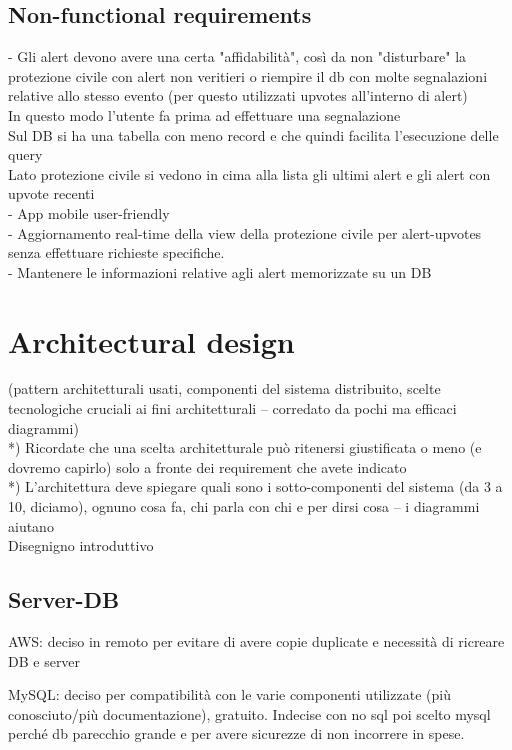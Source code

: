 \documentclass[a4paper,12pt]{report}
\begin{document}
\section{Non-functional requirements}
- Gli alert devono avere una certa "affidabilità", così da non "disturbare" la protezione civile con alert non veritieri o riempire il db con molte segnalazioni relative allo stesso evento (per questo utilizzati upvotes all'interno di alert)\\
In questo modo l'utente fa prima ad effettuare una segnalazione\\
Sul DB si ha una tabella con meno record e che quindi facilita l'esecuzione delle query\\
Lato protezione civile si vedono in cima alla lista gli ultimi alert e gli alert con upvote recenti\\
- App mobile user-friendly\\
- Aggiornamento real-time della view della protezione civile per alert-upvotes senza effettuare richieste specifiche.\\
- Mantenere le informazioni relative agli alert memorizzate su un DB

\chapter{Architectural design}

(pattern architetturali usati, componenti del sistema distribuito, scelte tecnologiche cruciali ai fini architetturali -- corredato da pochi ma efficaci diagrammi)\\

*) Ricordate che una scelta architetturale può ritenersi giustificata o meno (e dovremo capirlo) solo a fronte dei requirement che avete indicato\\

*) L'architettura deve spiegare quali sono i sotto-componenti del sistema (da 3 a 10, diciamo), ognuno cosa fa, chi parla con chi e per dirsi cosa -- i diagrammi aiutano\\

Disegnigno introduttivo

\section{Server-DB}
AWS: deciso in remoto per evitare di avere copie duplicate e necessità di ricreare DB e server

MySQL: deciso per compatibilità con le varie componenti utilizzate (più conosciuto/più documentazione), gratuito.
Indecise con no sql poi scelto mysql perché db parecchio grande e per avere sicurezze di non incorrere in spese.
\end{document}
